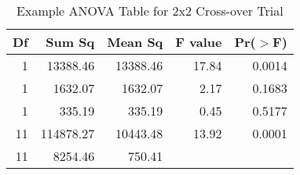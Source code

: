 \begin{table}[ht]
\centering
\begin{tabular}{rrrrr}
  \hline
Df & Sum Sq & Mean Sq & F value & Pr($>$F) \\ 
  \hline
1 & 13388.46 & 13388.46 & 17.84 & 0.0014 \\ 
  1 & 1632.07 & 1632.07 & 2.17 & 0.1683 \\ 
  1 & 335.19 & 335.19 & 0.45 & 0.5177 \\ 
  11 & 114878.27 & 10443.48 & 13.92 & 0.0001 \\ 
  11 & 8254.46 & 750.41 &  &  \\ 
   \hline
\end{tabular}
\caption{Example ANOVA Table for 2x2 Cross-over Trial} 
\label{anovaTable}
\end{table}

